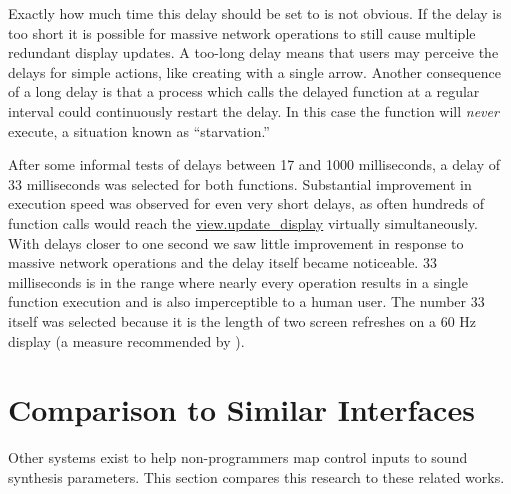 
Exactly how much time this delay should be set to is not obvious. If the delay is too short it is possible for massive network operations to still cause multiple redundant display updates. A too-long delay means that users may perceive the delays for simple actions, like creating with a single arrow. Another consequence of a long delay is that a process which calls the delayed function at a regular interval could continuously restart the delay. In this case the function will \emph{never} execute, a situation known as ``starvation.''

After some informal tests of delays between 17 and 1000 milliseconds, a delay of 33 milliseconds was selected for both functions. Substantial improvement in execution speed was observed for even very short delays, as often hundreds of function calls would reach the \url{view.update_display} virtually simultaneously. With delays closer to one second we saw little improvement in response to massive network operations and the delay itself became noticeable. 33 milliseconds is in the range where nearly every operation results in a single function execution and is also imperceptible to a human user. The number 33 itself was selected because it is the length of two screen refreshes on a 60 Hz display (a measure recommended by ).
	


\section{Comparison to Similar Interfaces} %
\label{sec:comparison_to_similar_interfaces}

Other systems exist to help non-programmers map control inputs to sound synthesis parameters. This section compares this research to these related works.

